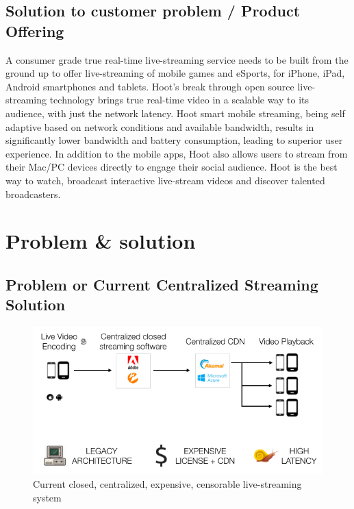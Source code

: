 \documentclass{article}
\begin{document}
\subsection{Solution to customer problem / Product Offering}
A consumer grade true real-time live-streaming service needs to be built from the ground up to offer live-streaming of mobile games and eSports, for iPhone, iPad, Android smartphones and tablets. Hoot's break through open source live-streaming technology brings true real-time video in a scalable way to its audience, with just the network latency. Hoot smart mobile streaming, being self adaptive based on network conditions and available bandwidth, results in significantly lower bandwidth and battery consumption, leading to superior user experience. In addition to the mobile apps, Hoot also allows users to stream from their Mac/PC devices directly to engage their social audience. Hoot is the best way to watch, broadcast interactive live-stream videos and discover talented broadcasters.

%
\fi
\section{Problem \& solution}

\subsection{Problem or Current Centralized Streaming Solution}

\begin{figure}[h!]
 \centering
 \includegraphics[width=1.0\textwidth]{static/problem-architecture}
 \caption{Current closed, centralized, expensive, censorable live-streaming system}
 \label{image:problem-architecture}
\end{figure}
\end{document}

